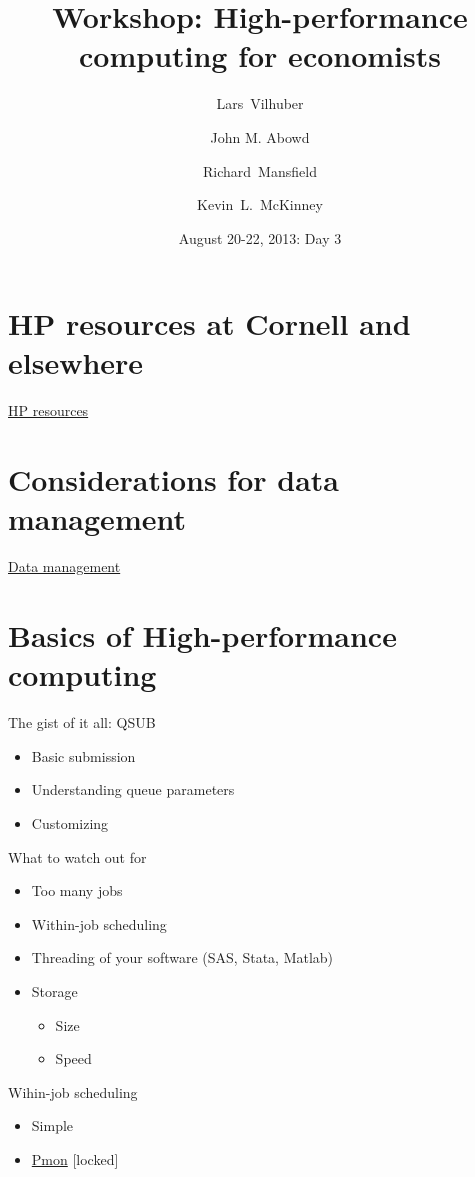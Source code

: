 \documentclass[xcolor=table,compress]{beamer}
\title[Computing for Economists]{Workshop: High-performance computing for economists}
\author[Vilhuber, Abowd, Mansfield, McKinney]{%
  Lars~Vilhuber\inst{1} \and
  John M. Abowd\inst{1} \and
  Richard~Mansfield\inst{1} \and
  Kevin~L.~McKinney %
}
\institute[Cornell]{
  \inst{1}%
   Cornell University, Economics Department,
}%
\date[August 20-22, 2013]{August 20-22, 2013: Day 3}
\begin{document}
\frame{\titlepage}

\section[HP resources]{HP resources at Cornell and elsewhere}
\begin{frame}
\href{day3-1.pdf}{HP resources}
\end{frame}
\section[Data mgmt]{Considerations for data management}
\begin{frame}
\href{day3-2.pdf}{Data management}
\end{frame}


\section[Basics]{Basics of High-performance computing}
\begin{frame}
\begin{block}{The gist of it all: QSUB}
\begin{itemize}
\item Basic submission
\item Understanding queue parameters
\item Customizing
\end{itemize}
\end{block}
\end{frame}


\begin{frame}[fragile]{What to watch out for}
\begin{itemize}
\item Too many jobs 
\item Within-job scheduling
\item Threading of your software (SAS, Stata, Matlab)
\item Storage
\begin{itemize}
\item Size
\item Speed
\end{itemize}
\end{itemize}
\end{frame}

\begin{frame}[fragile]{Wihin-job scheduling}
\begin{itemize}
\item Simple
\item \href{http://repository.vrdc.cornell.edu/VRDC/tools/trunk/pmon/}{Pmon} 
[locked]
\end{itemize}
\end{frame}
\end{document}
